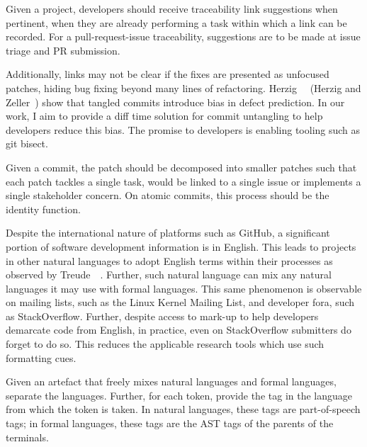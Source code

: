 \begin{tcolorbox}[title=Pull-request-Issue Traceability]
    Given a project, developers should receive traceability link suggestions
    when pertinent, \ie when they are already performing a task within which a
    link can be recorded. For a pull-request-issue traceability, suggestions are
    to be made at issue triage and PR submission.
\end{tcolorbox}

Additionally, links may not be clear if the fixes are presented as unfocused
patches, hiding bug fixing beyond many lines of refactoring.
Herzig~\etal~\cite{Herzig2016} (Herzig and Zeller~\cite{Herzig2013}) show that
tangled commits introduce bias in defect prediction. In our work, I aim to
provide a diff time solution for commit untangling to help developers reduce
this bias. The promise to developers is enabling tooling such as git bisect.

\begin{tcolorbox}[title=Commit Untangling]
    Given a commit, the patch should be decomposed into smaller patches such
    that each patch tackles a single task, \ie would be linked to a single issue
    or implements a single stakeholder concern. On atomic commits, this process
    should be the identity function.
\end{tcolorbox}

Despite the international nature of platforms such as GitHub, a significant
portion of software development information is in English. This leads to
projects in other natural languages to adopt English terms within their
processes as observed by Treude~\etal~\cite{Treude2015portuguese}. Further, such
natural language can mix any natural languages it may use with formal languages.
This same phenomenon is observable on mailing lists, such as the Linux Kernel
Mailing List, and developer fora, such as StackOverflow.  Further, despite
access to mark-up to help developers demarcate code from English, in practice,
even on StackOverflow submitters do forget to do so. This reduces the applicable
research tools which use such formatting cues.

\begin{tcolorbox}[title=Mixed-text Parsing]
    Given an artefact that freely mixes natural languages and formal languages,
    separate the languages. Further, for each token, provide the tag in the
    language from which the token is taken. In natural languages, these tags are
    part-of-speech tags; in formal languages, these tags are the AST tags of the
    parents of the terminals.
\end{tcolorbox}

